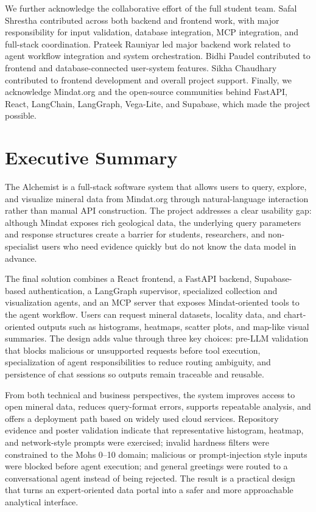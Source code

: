 \documentclass[12pt,oneside]{report}
\begin{document}
\noindent We further acknowledge the collaborative effort of the full student team. Safal Shrestha contributed across both backend and frontend work, with major responsibility for input validation, database integration, MCP integration, and full-stack coordination. Prateek Rauniyar led major backend work related to agent workflow integration and system orchestration. Bidhi Paudel contributed to frontend and database-connected user-system features. Sikha Chaudhary contributed to frontend development and overall project support. Finally, we acknowledge Mindat.org and the open-source communities behind FastAPI, React, LangChain, LangGraph, Vega-Lite, and Supabase, which made the project possible.

\clearpage
\tableofcontents
\clearpage
\listoftables
\clearpage
\listoffigures

\clearpage
\section*{Executive Summary}

\noindent The Alchemist is a full-stack software system that allows users to query, explore, and visualize mineral data from Mindat.org through natural-language interaction rather than manual API construction. The project addresses a clear usability gap: although Mindat exposes rich geological data, the underlying query parameters and response structures create a barrier for students, researchers, and non-specialist users who need evidence quickly but do not know the data model in advance.

\noindent The final solution combines a React frontend, a FastAPI backend, Supabase-based authentication, a LangGraph supervisor, specialized collection and visualization agents, and an MCP server that exposes Mindat-oriented tools to the agent workflow. Users can request mineral datasets, locality data, and chart-oriented outputs such as histograms, heatmaps, scatter plots, and map-like visual summaries. The design adds value through three key choices: pre-LLM validation that blocks malicious or unsupported requests before tool execution, specialization of agent responsibilities to reduce routing ambiguity, and persistence of chat sessions so outputs remain traceable and reusable.

\noindent From both technical and business perspectives, the system improves access to open mineral data, reduces query-format errors, supports repeatable analysis, and offers a deployment path based on widely used cloud services. Repository evidence and poster validation indicate that representative histogram, heatmap, and network-style prompts were exercised; invalid hardness filters were constrained to the Mohs 0--10 domain; malicious or prompt-injection style inputs were blocked before agent execution; and general greetings were routed to a conversational agent instead of being rejected. The result is a practical design that turns an expert-oriented data portal into a safer and more approachable analytical interface.
\end{document}
